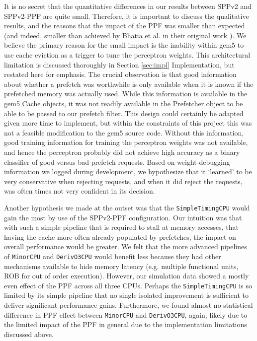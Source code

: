 \documentclass[10pt,conference]{IEEEtran}
\begin{document}
It is no secret that the quantitative differences in our results between SPPv2 and SPPv2-PPF are quite small. Therefore, it is important to discuss the qualitative results, and the reasons that the impact of the PPF was smaller than expected (and indeed, smaller than achieved by Bhatia et al. in their original work \cite{ppf}). We believe the primary reason for the small impact is the inability within gem5 to use cache eviction as a trigger to tune the perceptron weights. This architectural limitation is discussed thoroughly in Section \ref{sec:impl} Implementation, but restated here for emphasis. The crucial observation is that good information about whether a prefetch was worthwhile is only available when it is known if the prefetched memory was actually used. While this information is available in the gem5 Cache objects, it was not readily available in the Prefetcher object to be able to be passed to our prefetch filter. This design could certainly be adapted given more time to implement, but within the constraints of this project this was not a feasible modification to the gem5 source code. Without this information, good training information for training the perceptron weights was not available, and hence the perceptron probably did not achieve high accuracy as a binary classifier of good versus bad prefetch requests.  Based on weight-debugging information we logged during development, we hypothesize that it `learned' to be very conservative when rejecting requests, and when it did reject the requests, was often times not very confident in its decision. 

Another hypothesis we made at the outset was that the \texttt{SimpleTimingCPU} would gain the most by use of the SPPv2-PPF configuration. Our intuition was that with such a simple pipeline that is required to stall at memory accesses, that having the cache more often already populated by prefetches, the impact on overall performance would be greater. We felt that the more advanced pipelines of \texttt{MinorCPU} and \texttt{DerivO3CPU} would benefit less because they had other mechanisms available to hide memory latency (e.g. multiple functional units, ROB for out of order execution). However, our simulation data showed a mostly even effect of the PPF across all three CPUs. Perhaps the \texttt{SimpleTimingCPU} is so limited by its simple pipeline that no single isolated improvement is sufficient to deliver significant performance gains. Furthermore, we found almost no statistical difference in PPF effect between \texttt{MinorCPU} and \texttt{DerivO3CPU}, again, likely due to the limited impact of the PPF in general due to the implementation limitations discussed above.
\end{document}
